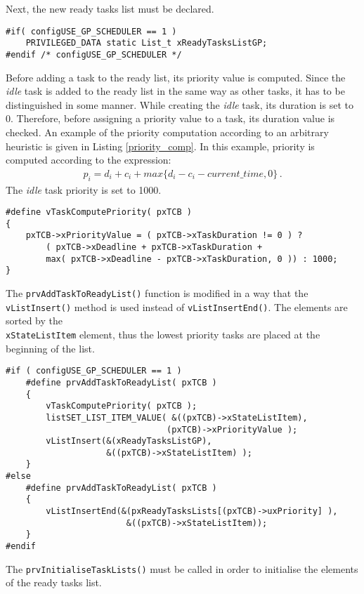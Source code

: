 Next, the new ready tasks list must be declared.
\begin{lstlisting}[frame=none, label={ready_list}, caption={Declaration of the new ready tasks list.}, captionpos=b]
#if( configUSE_GP_SCHEDULER == 1 )
	PRIVILEGED_DATA static List_t xReadyTasksListGP;
#endif /* configUSE_GP_SCHEDULER */
\end{lstlisting}
Before adding a task to the ready list, its priority value is computed. 
Since the \textit{idle} task is added to the ready list in the same way as other tasks, it has to be distinguished in some manner. 
While creating the \textit{idle} task, its duration is set to 0.
Therefore, before assigning a priority value to a task, its duration value is checked. 
An example of the priority computation according to an arbitrary heuristic is given in Listing \ref{priority_comp}. 
In this example, priority is computed according to the expression:
\begin{align*}
p_i = d_i + c_i + max\{ d_i - c_i - current\_time, 0 \} \, .
\end{align*}
The \textit{idle} task priority is set to 1000.
\begin{lstlisting}[frame=none, label={priority_comp}, caption={Macro function for priority computation.}, captionpos=b]
#define vTaskComputePriority( pxTCB )
{
	pxTCB->xPriorityValue = ( pxTCB->xTaskDuration != 0 ) ? 
		( pxTCB->xDeadline + pxTCB->xTaskDuration + 
		max( pxTCB->xDeadline - pxTCB->xTaskDuration, 0 )) : 1000;
}	
\end{lstlisting}
The \verb$prvAddTaskToReadyList()$ function is modified in a way that the \verb$vListInsert()$ method is used instead of \verb$vListInsertEnd()$. 
The elements are sorted by the \\\verb$xStateListItem$ element, thus the lowest priority tasks are placed at the beginning of the list. 
\begin{lstlisting}[frame=none, label={ready_add}, caption={Adding a new task to the ready list.}, captionpos=b]
#if ( configUSE_GP_SCHEDULER == 1 )
	#define prvAddTaskToReadyList( pxTCB )
	{
		vTaskComputePriority( pxTCB );
		listSET_LIST_ITEM_VALUE( &((pxTCB)->xStateListItem), 
								(pxTCB)->xPriorityValue );
		vListInsert(&(xReadyTasksListGP), 
					&((pxTCB)->xStateListItem) );
	}																								
#else 																								
	#define prvAddTaskToReadyList( pxTCB )
	{
		vListInsertEnd(&(pxReadyTasksLists[(pxTCB)->uxPriority] ), 
						&((pxTCB)->xStateListItem));
	}
#endif
\end{lstlisting}
The \verb$prvInitialiseTaskLists()$ must be called in order to initialise the elements of the ready tasks list.
